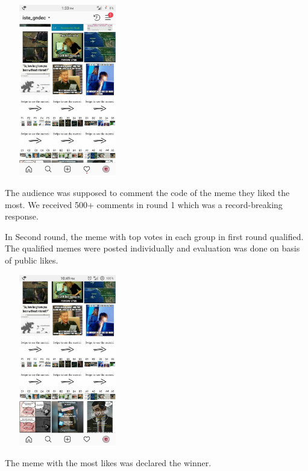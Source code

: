 \documentclass[12pt, a4 paper]{article}
\begin{document}
\begin{center}
\begin{Large}
\begin{multicols}{2}
\includegraphics[width=5.5cm, height=7.5cm]{image6.jpeg}

\columnbreak
{} The audience was supposed to comment the code of the meme they liked the most. We received 500+ comments in round 1 which was a record-breaking response.
  
\end{multicols} 

\begin{multicols}{2}
 In Second round, the meme with top votes in each group in first round qualified.  The qualified memes were posted individually and evaluation was done on basis of public likes.

\columnbreak
\includegraphics[width=5.5cm, height=7.5cm]{image3.jpeg}
  
\end{multicols} 

  The meme with the most likes was declared the winner.

\end{Large} 
\end{center}
\end{document}
